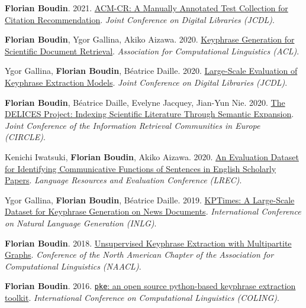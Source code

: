 \item
\textbf{Florian Boudin}.
2021.
\href{https://arxiv.org/pdf/2108.07571.pdf}{ACM-CR: A Manually Annotated Test Collection for Citation Recommendation}.
\textit{Joint Conference on Digital Libraries (JCDL)}.
\label{boudin-2021-acm}

\item
\textbf{Florian Boudin}, Ygor Gallina, Akiko Aizawa.
2020.
\href{https://aclanthology.org/2020.acl-main.105.pdf}{Keyphrase Generation for Scientific Document Retrieval}.
\textit{Association for Computational Linguistics (ACL)}.
\label{boudin-etal-2020-keyphrase}

\item
Ygor Gallina, \textbf{Florian Boudin}, Béatrice Daille.
2020.
\href{https://dl.acm.org/doi/10.1145/3383583.3398517}{Large-Scale Evaluation of Keyphrase Extraction Models}.
\textit{Joint Conference on Digital Libraries (JCDL)}.
\label{gallina-etal-2020-large}

\item
\textbf{Florian Boudin}, Béatrice Daille, Evelyne Jacquey, Jian-Yun Nie.
2020.
\href{http://ceur-ws.org/Vol-2621/CIRCLE20_27.pdf}{The DELICES Project: Indexing Scientific Literature Through Semantic Expansion}.
\textit{Joint Conference of the Information Retrieval Communities in Europe (CIRCLE)}.
\label{boudin-etal-2020-delices}

\item
Kenichi Iwatsuki, \textbf{Florian Boudin}, Akiko Aizawa.
2020.
\href{https://aclanthology.org/2020.lrec-1.212.pdf}{An Evaluation Dataset for Identifying Communicative Functions of Sentences in English Scholarly Papers}.
\textit{Language Resources and Evaluation Conference (LREC)}.
\label{iwatsuki-etal-2020-evaluation}

\item 
Ygor Gallina, \textbf{Florian Boudin}, Béatrice Daille.
2019.
\href{https://aclanthology.org/W19-8617.pdf}{KPTimes: A Large-Scale Dataset for Keyphrase Generation on News Documents}.
\textit{International Conference on Natural Language Generation (INLG)}.
\label{gallina-etal-2019-kptimes}

\item
\textbf{Florian Boudin}.
2018.
\href{https://aclanthology.org/N18-2105.pdf}{Unsupervised Keyphrase Extraction with Multipartite Graphs}.
\textit{Conference of the North American Chapter of the Association for Computational Linguistics (NAACL)}.

\item 
\textbf{Florian Boudin}.
2016.
\href{https://aclanthology.org/C16-2015.pdf}{\texttt{pke}: an open source python-based keyphrase extraction toolkit}.
\textit{International Conference on Computational Linguistics (COLING)}.
\label{boudin-2018-unsupervised}

